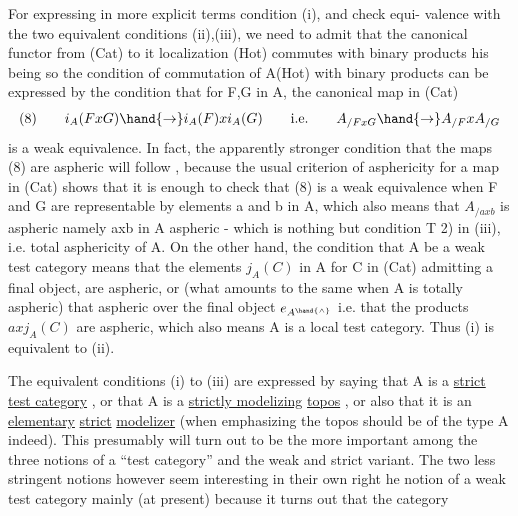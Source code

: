 For expressing in more explicit terms condition (i), and check equi-%
valence with the two equivalent conditions (ii),(iii), we need to 
admit that the canonical functor from (Cat) to it localization (Hot)
commutes with binary products his being so\hand{,} the condition of commutation
of A\hand{\ensuremath{^{\wedge}}}\hand{\ensuremath{\to}}(Hot) with binary products can be expressed by the  condition that
for F,G in A\hand{\ensuremath{^{\wedge}}}, the canonical map in (Cat)
\[ (8) \qquad i_A(FxG)\hand{\ensuremath{\to}} i_A(F)xi_A(G) \qquad \text{i.e.} \qquad A_{/FxG}\hand{\ensuremath{\to}} A_{/F}xA_{/G} \]
is a weak equivalence. In fact, the apparently stronger condition
that the maps (8) are aspheric will follow , because the usual criterion
of asphericity for a map in (Cat) shows that it is enough  to check that
(8) is a weak equivalence when F and G are representable by elements
a and b in A, which also means that $A_{/axb}$ is aspheric namely axb in A\hand{\ensuremath{^{\wedge}}}
aspheric - which is nothing but condition T 2) in (iii), 
i.e. total asphericity of A\hand{\ensuremath{^{\wedge}}}. On the other hand, the condition that A
be a weak test category means that the elements $j_A(C)$ in A\hand{\ensuremath{^{\wedge}}}\hand{,} for C in
(Cat) admitting a final object, are aspheric, or (what amounts to the
same when A\hand{\ensuremath{^{\wedge}}} is totally aspheric) that   aspheric over the final
object $e_{A^{\hand{\wedge}}}$ i.e. that the products $axj_A(C)$ are aspheric, which also 
means A is a local test category. Thus (i)  is equivalent to (ii).

The equivalent conditions (i) to (iii) are expressed by saying that
A is a \uline{strict test category} , or that  A\hand{\ensuremath{^{\wedge}}} is a \uline{strictly modelizing}
\uline{topos} , or also that it is an \uline{elementary} \uline{strict} \uline{modelizer} (when
emphasizing the topos  should be of the type A\hand{\ensuremath{^{\wedge}}}\hand{/} indeed). This presumably
will turn out to be the more important among the three notions\hand{,} of a 
``test category'' and the weak and strict variant. The two less stringent
notions however seem interesting in their own right he notion of a weak
test category mainly (at present) because it turns out that the category
